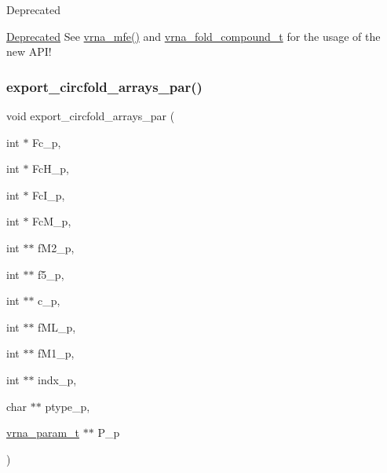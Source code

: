 \begin{DoxyRefDesc}{Deprecated}
\item[\hyperlink{deprecated__deprecated000074}{Deprecated}]See \hyperlink{group__mfe__global_gabd3b147371ccf25c577f88bbbaf159fd}{vrna\+\_\+mfe()} and \hyperlink{group__fold__compound_ga1b0cef17fd40466cef5968eaeeff6166}{vrna\+\_\+fold\+\_\+compound\+\_\+t} for the usage of the new A\+P\+I!\end{DoxyRefDesc}
\mbox{\label{group__mfe__global__deprecated_ga004bb901e7fd2f8d5ae68f9530318ce1}} 
\subsubsection{\texorpdfstring{export\+\_\+circfold\+\_\+arrays\+\_\+par()}{export\_circfold\_arrays\_par()}}
{\footnotesize\ttfamily void export\+\_\+circfold\+\_\+arrays\+\_\+par (\begin{DoxyParamCaption}\item[{int $\ast$}]{Fc\+\_\+p,  }\item[{int $\ast$}]{Fc\+H\+\_\+p,  }\item[{int $\ast$}]{Fc\+I\+\_\+p,  }\item[{int $\ast$}]{Fc\+M\+\_\+p,  }\item[{int $\ast$$\ast$}]{f\+M2\+\_\+p,  }\item[{int $\ast$$\ast$}]{f5\+\_\+p,  }\item[{int $\ast$$\ast$}]{c\+\_\+p,  }\item[{int $\ast$$\ast$}]{f\+M\+L\+\_\+p,  }\item[{int $\ast$$\ast$}]{f\+M1\+\_\+p,  }\item[{int $\ast$$\ast$}]{indx\+\_\+p,  }\item[{char $\ast$$\ast$}]{ptype\+\_\+p,  }\item[{\hyperlink{group__energy__parameters_ga8a69ca7d787e4fd6079914f5343a1f35}{vrna\+\_\+param\+\_\+t} $\ast$$\ast$}]{P\+\_\+p }\end{DoxyParamCaption})}



